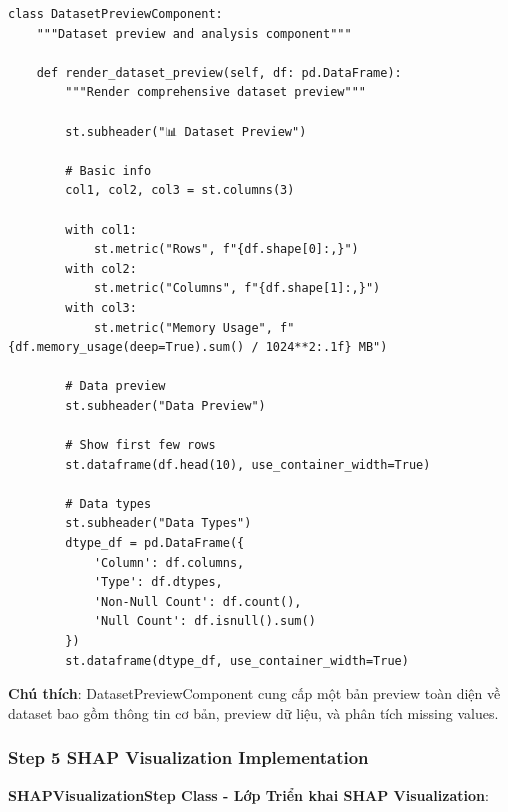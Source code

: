 \begin{verbatim}
class DatasetPreviewComponent:
    """Dataset preview and analysis component"""
    
    def render_dataset_preview(self, df: pd.DataFrame):
        """Render comprehensive dataset preview"""
        
        st.subheader("📊 Dataset Preview")
        
        # Basic info
        col1, col2, col3 = st.columns(3)
        
        with col1:
            st.metric("Rows", f"{df.shape[0]:,}")
        with col2:
            st.metric("Columns", f"{df.shape[1]:,}")
        with col3:
            st.metric("Memory Usage", f"{df.memory_usage(deep=True).sum() / 1024**2:.1f} MB")
        
        # Data preview
        st.subheader("Data Preview")
        
        # Show first few rows
        st.dataframe(df.head(10), use_container_width=True)
        
        # Data types
        st.subheader("Data Types")
        dtype_df = pd.DataFrame({
            'Column': df.columns,
            'Type': df.dtypes,
            'Non-Null Count': df.count(),
            'Null Count': df.isnull().sum()
        })
        st.dataframe(dtype_df, use_container_width=True)
\end{verbatim}

\textbf{Chú thích}: DatasetPreviewComponent cung cấp một bản preview toàn diện về dataset bao gồm thông tin cơ bản, preview dữ liệu, và phân tích missing values.

\subsubsection{Step 5 SHAP Visualization Implementation}

\textbf{SHAPVisualizationStep Class - Lớp Triển khai SHAP Visualization}:

